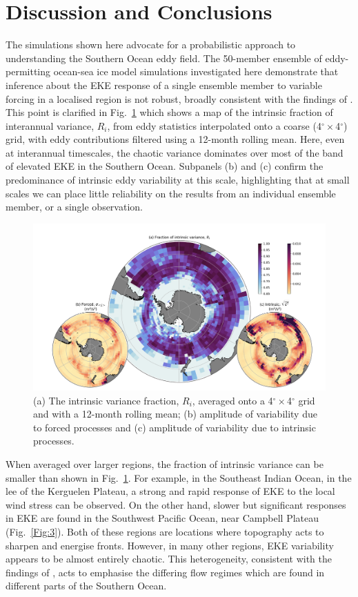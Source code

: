 \documentclass[linenumbers]{agujournal2019}
\begin{document}
\section{Discussion and Conclusions}
The simulations shown here advocate for a probabilistic approach to understanding the Southern Ocean eddy field.
The 50-member ensemble of eddy-permitting ocean-sea ice model simulations investigated here demonstrate that inference about the EKE response of a single ensemble member to variable forcing in a localised region is not robust, broadly consistent with the findings of \citet{Zhang2021}.
This point is clarified in Fig.~\ref{Fig:6} which shows a map of the intrinsic fraction of interannual variance, $R_i$, from eddy statistics interpolated onto a coarse (4$^\circ \times$4$^\circ$) grid, with eddy contributions filtered using a 12-month rolling mean.
Here, even at interannual timescales, the chaotic variance dominates over most of the band of elevated EKE in the Southern Ocean. 
Subpanels (b) and (c) confirm the predominance of intrinsic eddy variability at this scale, highlighting that at small scales we can place little reliability on the results from an individual ensemble member, or a single observation.

\begin{figure}[t]
\begin{center}
\includegraphics[width=\hsize]{Figure7}
\caption{(a) The intrinsic variance fraction, $R_i$, averaged onto a  4$^\circ \times$4$^\circ$ grid and with a 12-month rolling mean; (b) amplitude of variability due to forced processes and (c) amplitude of variability due to intrinsic processes. }
\label{Fig:6}
\end{center}
\end{figure}

When averaged over larger regions, the fraction of intrinsic variance can be smaller than shown in Fig.~\ref{Fig:6}.
For example, in the Southeast Indian Ocean, in the lee of the Kerguelen Plateau, a strong and rapid response of EKE to the local wind stress can be observed.
On the other hand, slower but significant responses in EKE are found in the Southwest Pacific Ocean, near Campbell Plateau (Fig.~\ref{Fig:3}).
Both of these regions are locations where topography acts to sharpen and energise fronts.
However, in many other regions, EKE variability appears to be almost entirely chaotic.
This heterogeneity, consistent with the findings of \citet{Patara2016}, acts to emphasise the differing flow regimes which are found in different parts of the Southern Ocean.
\end{document}
